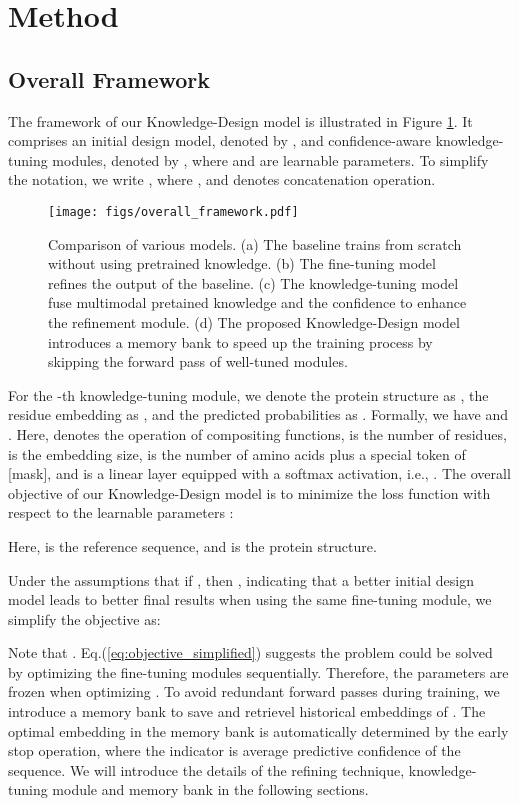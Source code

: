 \documentclass{article}
\begin{document}
 \section{Method}
\subsection{Overall Framework}
The framework of our Knowledge-Design model is illustrated in Figure \ref{fig:framework}. It comprises an initial design model, denoted by , and  confidence-aware knowledge-tuning modules, denoted by , where  and  are learnable parameters. To simplify the notation, we write , where , and  denotes concatenation operation. 




\begin{figure}[h]
    \centering
    \texttt{[image: figs/overall\_framework.pdf]}
    \caption{Comparison of various models. (a) The baseline trains from scratch without using pretrained knowledge. (b) The fine-tuning model refines the output of the baseline. (c) The knowledge-tuning model fuse multimodal pretained knowledge and the confidence to enhance the refinement module. 
    (d) The proposed Knowledge-Design model introduces a memory bank to speed up the training process by skipping the forward pass of well-tuned modules.}
    \label{fig:framework}
    \vspace{-3mm}
 \end{figure}




For the -th knowledge-tuning module, we denote the protein structure as , the residue embedding as , and the predicted probabilities as . Formally, we have  and . Here,  denotes the operation of compositing functions,  is the number of residues,  is the embedding size,  is the number of amino acids plus a special token of [mask], and  is a linear layer equipped with a softmax activation, i.e., . The overall objective of our Knowledge-Design model is to minimize the loss function  with respect to the learnable parameters :

Here,  is the reference sequence, and  is the protein structure.

Under the assumptions that if , then , indicating that a better initial design model leads to better final results when using the same fine-tuning module, we simplify the objective as:

Note that . Eq.(\ref{eq:objective_simplified}) suggests the problem could be solved by optimizing the fine-tuning modules  sequentially. Therefore, the parameters  are frozen when optimizing . To avoid redundant forward passes during training, we introduce a memory bank to save and retrievel historical embeddings of . The optimal embedding in the memory bank is automatically determined by the early stop operation, where the indicator is average predictive confidence of the sequence. We will introduce the details of the refining technique, knowledge-tuning module and memory bank in the following sections.
\end{document}

